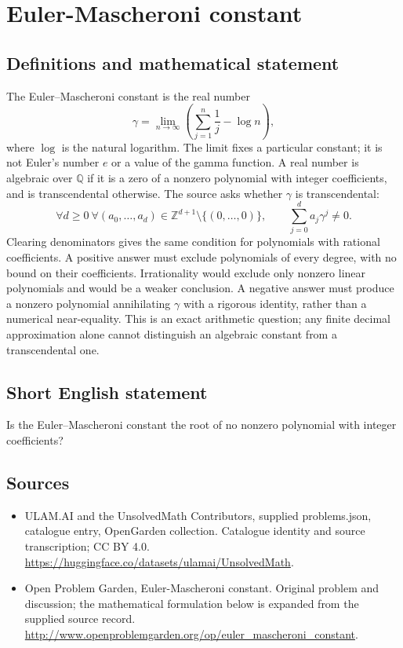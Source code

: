 \documentclass[11pt,a4paper]{article}
\begin{document}
\section*{Euler-Mascheroni constant}\label{statement}

\subsection{Definitions and mathematical statement}
The Euler--Mascheroni constant is the real number
\[
 \gamma=\lim_{n\to\infty}\left(\sum_{j=1}^{n}\frac1j-\log n\right),
\]
where $\log$ is the natural logarithm. The limit fixes a particular
constant; it is not Euler's number $e$ or a value of the gamma function.
A real number is algebraic over $\mathbb Q$ if it is a zero of a
nonzero polynomial with integer coefficients, and is transcendental
otherwise. The source asks whether $\gamma$ is transcendental:
\[
 \forall d\ge0\ \forall(a_0,\ldots,a_d)\in\mathbb Z^{d+1}
       \setminus\{(0,\ldots,0)\},\qquad
                   \sum_{j=0}^{d}a_j\gamma^j\ne0.
\]
Clearing denominators gives the same condition for polynomials with
rational coefficients. A positive answer must exclude polynomials of
every degree, with no bound on their coefficients. Irrationality
would exclude only nonzero linear polynomials and would be a weaker
conclusion. A negative answer must produce a nonzero polynomial
annihilating $\gamma$ with a rigorous identity, rather than a numerical
near-equality. This is an exact arithmetic question; any finite decimal
approximation alone cannot distinguish an algebraic constant from a
transcendental one.
\subsection{Short English statement}
Is the Euler--Mascheroni constant the root of no nonzero polynomial with integer coefficients?
\subsection{Sources}
\begin{itemize}
\item[S1] ULAM.AI and the UnsolvedMath Contributors, supplied problems.json, catalogue entry, OpenGarden collection. Catalogue identity and source transcription; CC BY 4.0.
\url{https://huggingface.co/datasets/ulamai/UnsolvedMath}.
\item[S2] Open Problem Garden, Euler-Mascheroni constant. Original problem and discussion; the mathematical formulation below is expanded from the supplied source record.
\url{http://www.openproblemgarden.org/op/euler_mascheroni_constant}.
\end{itemize}
\end{document}
